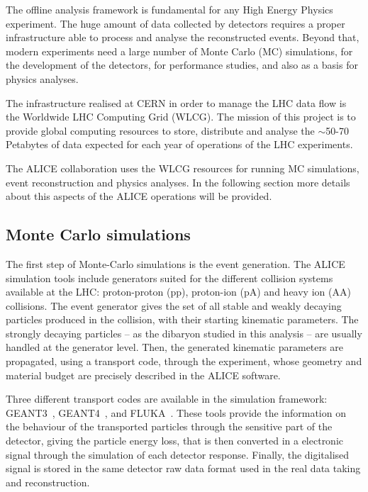 The offline analysis framework is fundamental for any High Energy Physics experiment.
The huge amount of data collected by detectors requires a proper infrastructure able to process and 
analyse the reconstructed events.
Beyond that, modern experiments need a large number of Monte Carlo (MC) simulations, for the
development of the detectors, for performance studies, and also as a basis for physics analyses.

The infrastructure realised at CERN in order to manage the LHC data flow is the Worldwide 
LHC Computing Grid (WLCG). The mission of this project is to provide global 
computing resources to store, distribute and analyse the $\sim$50-70 Petabytes of data expected for 
each year of operations of the LHC experiments.

The ALICE collaboration uses the WLCG resources for running MC simulations, event reconstruction and
physics analyses. 
In the following section more details about this aspects of the ALICE operations will be provided.

%
\subsection{Monte Carlo simulations} \label{sec:montecarlo}

The first step of Monte-Carlo simulations is the event generation. 
The ALICE simulation tools include generators suited for the different collision systems available at
the LHC: proton-proton (pp), proton-ion (pA) and heavy ion (AA) collisions.
The event generator gives the set of all stable and weakly decaying particles produced in the
collision, with their starting kinematic parameters. 
The strongly decaying particles -- as the \dst dibaryon studied in this analysis -- are usually 
handled at the generator level.
Then, the generated kinematic parameters are propagated, using a transport code, through the
experiment, whose geometry and material budget are precisely described in the ALICE software.

Three different transport codes are available in the simulation framework: GEANT3~\cite{geant3},
GEANT4~\cite{geant4}, and FLUKA~\cite{fluka1,fluka2}.
These tools provide the information on the behaviour of the transported particles through the sensitive
part of the detector, giving the particle energy loss, that is then converted in a electronic signal through the simulation of each
detector response.
Finally, the digitalised signal is stored in the same detector raw data format used in the 
real data taking and reconstruction.

